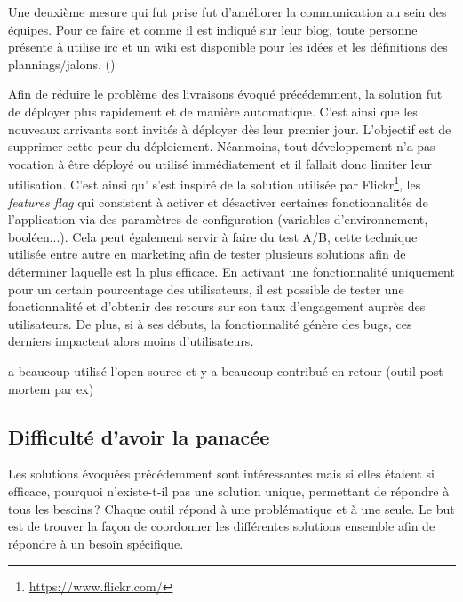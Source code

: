Une deuxième mesure qui fut prise fut d'améliorer la communication au sein des équipes. Pour ce faire et comme il est indiqué sur leur blog, toute personne présente à \etsy{} utilise \gls{irc} et un wiki est disponible pour les idées et les définitions des plannings/jalons. ()

Afin de réduire le problème des livraisons évoqué précédemment, la solution fut de déployer plus rapidement et de manière automatique. C'est ainsi que les nouveaux arrivants sont invités à déployer dès leur premier jour. L'objectif est de supprimer cette peur du déploiement. Néanmoins, tout développement n'a pas vocation à être déployé ou utilisé immédiatement et il fallait donc limiter leur utilisation. C'est ainsi qu'\etsy{} s'est inspiré de la solution utilisée par Flickr\footnote{\url{https://www.flickr.com/}}, les \emph{features flag} qui consistent à activer et désactiver certaines fonctionnalités de l'application via des paramètres de configuration (variables d'environnement, booléen...). Cela peut également servir à faire du test A/B, cette technique utilisée entre autre en marketing afin de tester plusieurs solutions afin de déterminer laquelle est la plus efficace. En activant une fonctionnalité uniquement pour un certain pourcentage des utilisateurs, il est possible de tester une fonctionnalité et d'obtenir des retours sur son taux d'engagement auprès des utilisateurs. De plus, si à ses débuts, la fonctionnalité génère des bugs, ces derniers impactent alors moins d'utilisateurs.



a beaucoup utilisé l'open source et y a beaucoup contribué en retour (outil post mortem par ex) %

\subsection{Difficulté d'avoir la panacée}

Les solutions évoquées précédemment sont intéressantes mais si elles étaient si efficace, pourquoi n'existe-t-il pas une solution unique, permettant de répondre à tous les besoins ? Chaque outil répond à une problématique et à une seule. Le but est de trouver la façon de coordonner les différentes solutions ensemble afin de répondre à un besoin spécifique.

